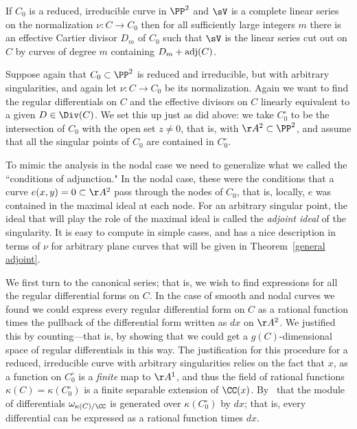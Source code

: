 \begin{theorem}
If $C_{0}$ is a reduced, irreducible curve in $\PP^{2}$ and $\sV$ is a complete linear series
on the normalization $\nu: C\to C_{0}$ then for all sufficiently large integers $m$ there is an effective Cartier divisor $D_{m}$  of $C_{0}$ 
such that $\sV$ is the linear series cut out on $C$ by curves of degree $m$ containing $D_{m}+\adj(C)$.
\end{theorem}


Suppose again that $C_0 \subset \PP^2$ is reduced and irreducible, but with arbitrary singularities, and again let $\nu : C \to C_0$ be its normalization. Again we want to find the regular differentials on $C$ and the effective divisors on $C$ linearly equivalent to a given $D \in \Div(C)$. We set this up just as did above: we take $C^\circ_0$ to be the intersection of $C_0$ with the open set $z \neq 0$, that is, with $\AA^2\subset \PP^2$, and assume that
all the singular points of $C_0$ are contained in $C^\circ_0$.

To mimic the analysis in the nodal case we need to generalize what we called the ``conditions of adjunction." In the nodal case, these were the conditions that a curve $e(x,y)=0 \subset \AA^2$ pass through the nodes of $C_0$, that is, locally, $e$ was contained in the maximal ideal
at each node. For an arbitrary singular point, the ideal that will play the role of the maximal ideal is called the \emph{adjoint ideal} of the singularity. It is easy to compute in simple cases, and has a nice description in terms of $\nu$ for arbitrary plane curves that will be given in Theorem~\ref{general adjoint}.

We first turn to the canonical series; that is, we wish to find expressions for all the regular differential forms on $C$. In the case of smooth and nodal curves we found we could express every regular differential form
on $C$ as a rational function times the pullback of the differential form written as $dx$ on $\AA^2$. We justified this
by counting---that is, by showing that we could get a $g(C)$-dimensional space of regular differentials in this way. The justification for 
this procedure for a reduced, irreducible curve with arbitrary singularities relies on the fact that $x$, as a function on $C^\circ_0$
is a \emph{finite} map to $\AA^1$, and thus the field of rational functions $\kappa(C) = \kappa(C^\circ_0)$ is a finite
separable extension of $\CC(x)$. By~\cite[Section 16.5]{Eisenbud1995} that the module of differentials 
$\omega_{\kappa(C)/\CC}$ is generated over $\kappa(C^\circ_0)$ by $dx$; that is, every differential can be expressed as a rational function
times $dx$. 

